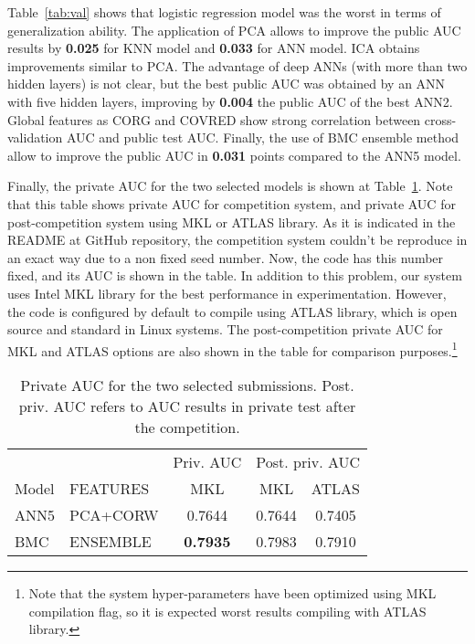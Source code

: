 \documentclass[a4paper,english,twoside]{article}
\begin{document}
Table~\ref{tab:val} shows that logistic regression model was the worst in
terms of generalization ability. The application of PCA allows to
improve the public AUC results by \textbf{0.025} for KNN model and
\textbf{0.033} for ANN model. ICA obtains improvements similar to PCA.
The advantage of deep ANNs (with more than two hidden layers) is not
clear, but the best public AUC was obtained by an ANN with five hidden
layers, improving by \textbf{0.004} the public AUC of the best ANN2.
Global features as CORG and COVRED show strong correlation between
cross-validation AUC and public test AUC. Finally, the use of BMC
ensemble method allow to improve the public AUC in \textbf{0.031} points
compared to the ANN5 model.

Finally, the private AUC for the two selected models is shown at
Table~\ref{tab:private}. Note that this table shows private AUC for competition
system, and private AUC for post-competition system using MKL or ATLAS
library. As it is indicated in the README at GitHub repository, the competition
system couldn't be reproduce in an exact way due to a non fixed seed number.
Now, the code has this number fixed, and its AUC is shown in the table. In
addition to this problem, our system uses Intel MKL library for the best performance
in experimentation. However, the code is configured by default to compile using
ATLAS library, which is open source and standard in Linux systems. The
post-competition private AUC for MKL and ATLAS options are also shown in the
table for comparison purposes.\footnote{Note that the system hyper-parameters
  have been optimized using MKL compilation flag, so it is expected worst
  results compiling with ATLAS library.}

\begin{table}
  \centering
  \begin{tabular}{|l|l|c||c|c|}
    \hline
          &          & Priv. AUC & \multicolumn{2}{|c|}{Post. priv. AUC}\\
    Model & FEATURES & MKL & \multicolumn{1}{|c}{MKL} & \multicolumn{1}{c|}{ATLAS} \\
    \hline
    \hline
    ANN5 & PCA+CORW & 0.7644          & 0.7644 & 0.7405\\
    BMC & ENSEMBLE & \textbf{0.7935}  & 0.7983 & 0.7910\\
    \hline
  \end{tabular}
  \caption{Private AUC for the two selected submissions. Post. priv. AUC refers
    to AUC results in private test after the competition.\label{tab:private}}
\end{table}
\end{document}
